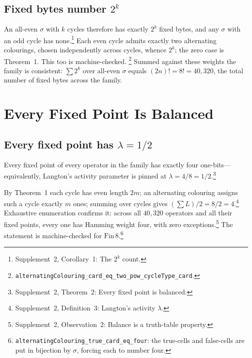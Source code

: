 \documentclass[man,12pt,floatsintext,donotrepeattitle]{apa7}
\newcommand{\sig}{\sigma}
\newcommand{\supptheorytext}[2]{Supplement~2, #1: #2.}
\newcommand{\supptheory}[2]{\footnote{\supptheorytext{#1}{#2}}}
\begin{document}
\subsection{Fixed bytes number \texorpdfstring{$2^k$}{2 to the k}}

An all-even $\sig$ with $k$ cycles therefore has exactly $2^k$ fixed bytes, and any
$\sig$ with an odd cycle has none.\supptheory{Corollary~1}{The $2^k$ count}
Each even cycle admits exactly two alternating colourings, chosen independently
across cycles, whence $2^k$; the zero case is Theorem~1. This too
is machine-checked.%
\footnote{\texttt{alternatingColouring\_card\_eq\_two\_pow\_cycleType\_card}.}
Summed against these weights the family is consistent:
$\sum 2^{k}$ over all-even $\sig$ equals $(2n)! = 8! = 40{,}320$, the total
number of fixed bytes across the family.

\section{Every Fixed Point Is Balanced}
\label{sec:lambda}

\subsection{Every fixed point has \texorpdfstring{$\lambda = 1/2$}{lambda = 1/2}}

Every fixed point of every operator in the family has exactly four one-bits---equivalently,
Langton's activity parameter is pinned at $\lambda = 4/8 = 1/2$.\supptheory{Theorem~2}{Every fixed point is balanced}

\noindent By Theorem~1 each cycle has even length $2m$; an
alternating colouring assigns such a cycle exactly $m$ ones; summing over
cycles gives $(\sum L)/2 = 8/2 = 4$.\supptheory{Definition~3}{Langton's activity $\lambda$} Exhaustive enumeration confirms it:
across all $40{,}320$ operators and all their fixed points, every one has
Hamming weight four, with zero exceptions.\supptheory{Observation~2}{Balance is a truth-table property} The statement is machine-checked
for $\mathrm{Fin}\,8$.\footnote{%
\texttt{alternatingColouring\_true\_card\_eq\_four}: the true-cells and
false-cells are put in bijection by $\sig$, forcing each to number four.}
\end{document}
